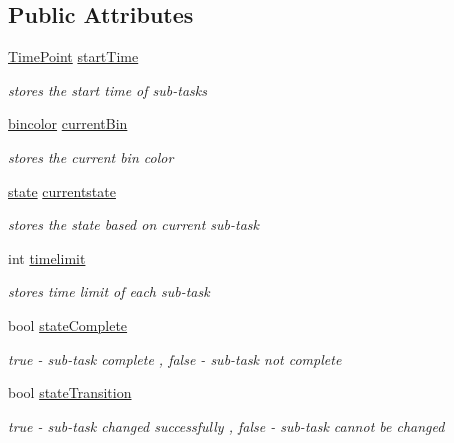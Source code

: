 \subsection*{Public Attributes}
\begin{DoxyCompactItemize}
\item 
\hyperlink{thruster__driver_8cpp_ad3e807c387dc076de974ff7eac67ad81}{Time\+Point} \hyperlink{classBinsTask_a0f9b188187c02eaf4081c896bed1a1d8}{start\+Time}
\begin{DoxyCompactList}\small\item\em stores the start time of sub-\/tasks \end{DoxyCompactList}\item 
\hyperlink{BinsTask_8h_aa849c9e7a5801c9746b10a3667604f1e}{bincolor} \hyperlink{classBinsTask_ac52fdf90cc77856e4fd389b627e0f9e6}{current\+Bin}
\begin{DoxyCompactList}\small\item\em stores the current bin color \end{DoxyCompactList}\item 
\hyperlink{BinsTask_8h_adc6e5733fc3c22f0a7b2914188c49c90}{state} \hyperlink{classBinsTask_a582b4e240c7018b7119f20c66860a6cf}{currentstate}
\begin{DoxyCompactList}\small\item\em stores the state based on current sub-\/task \end{DoxyCompactList}\item 
int \hyperlink{classBinsTask_ad227a105c8a9d4fbd4b11ac8292013cc}{timelimit}
\begin{DoxyCompactList}\small\item\em stores time limit of each sub-\/task \end{DoxyCompactList}\item 
bool \hyperlink{classBinsTask_a9376c8b742619429bf6e71818aa4813c}{state\+Complete}
\begin{DoxyCompactList}\small\item\em true -\/ sub-\/task complete , false -\/ sub-\/task not complete \end{DoxyCompactList}\item 
bool \hyperlink{classBinsTask_a96feda59c1d8c1657a93b8541703c6f3}{state\+Transition}
\begin{DoxyCompactList}\small\item\em true -\/ sub-\/task changed successfully , false -\/ sub-\/task cannot be changed \end{DoxyCompactList}\item 

\end{DoxyCompactItemize}
